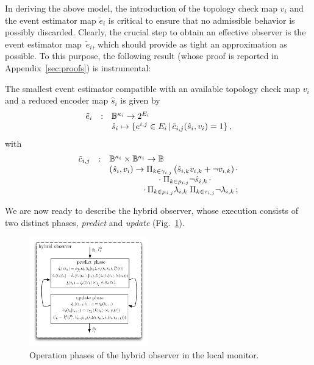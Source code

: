 \documentclass[journal, onecolumn, 12pt]{styles/IEEEtran}
\begin{document}
In deriving the above model, the introduction of the topology check map $v_i$ and the event estimator map $\tilde{e}_i$ is critical to ensure that no admissible behavior is possibly discarded. Clearly, the crucial step to obtain an effective observer is the event estimator map~$\tilde{e}_i$, which should provide as tight an approximation as possible. To this purpose, the following result (whose proof is reported in Appendix~\ref{sec:proofs}) is instrumental:
\begin{theorem}
\label{th:smallest-estimator}
The smallest event estimator compatible with an available topology
check map $v_i$ and a reduced encoder map $\hat{s}_i$ is given by 
\begin{equation*}
\begin{array}{rcl}
\tilde{e}_i & : & \Bbb{B}^{\kappa_i} \rightarrow 2^{E_i} \\
& & \hat{s}_i \mapsto \{e^{i,j} \in E_i \, | \, \tilde{c}_{i,j}(\hat{s}_i, v_i) = 1\} \, ,
\end{array}
\end{equation*}
with
 \begin{equation}
\label{eq:monitor:detector-map}
\begin{array}{rcl}
\tilde{c}_{i,j} & : & \bool^{\kappa_i} \times \bool^{\kappa_i} \rightarrow \bool \\
& & (\hat{s}_i, v_i) \rightarrow \Pi_{k \in \gamma_{i,j}} \left(\hat{s}_{i,k} v_{i,k}+\neg v_{i,k}\right) \cdot \\
& & \;\;\;\;\;\;\;\;\;\;\;\;\;\;\;\;\;\;\;\;\; \cdot \; \Pi_{k \in \rho_{i,j}} \neg \hat{s}_{i,k} \, \cdot \\
& & \;\;\;\;\;\;\;\;\,\;\;\;\;\;\; \cdot \, \Pi_{k \in \mu_{i,j}} \lambda_{i,k} \; \Pi_{k \in \tau_{i,j}} \neg \lambda_{i,k}
\, ;
\end{array}
\end{equation}
\end{theorem}

We are now ready to describe the hybrid observer, whose execution consists of two distinct phases, {\em predict} and {\em update} (Fig.~\ref{fig:ids:monitor:phases}).
\begin{figure}[!]
\centering
\includegraphics[width=0.46\textwidth,clip]{images/monitor-phases.pdf}
\caption{Operation phases of the hybrid observer in the local monitor.}
\label{fig:ids:monitor:phases}
\end{figure}
\end{document}
